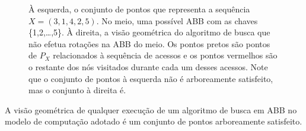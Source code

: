 \begin{figure}[h!]
\begin{minipage}[b]{0.33\textwidth}
    \end{minipage}\hfill
    \begin{minipage}[b]{0.33\textwidth}
        \centering
    \end{minipage}
    \caption{À esquerda, o conjunto de pontos que representa a sequência $X = (3,1,4,2,5)$. No meio, uma possível ABB com as chaves \{1,2,\ldots,5\}. À direita, a visão geométrica do algoritmo de busca que não efetua rotações na ABB do meio. Os pontos pretos são pontos de $P_X$ relacionados à sequência de acessos e os pontos vermelhos são o restante dos nós visitados durante cada um desses acessos. Note que o conjunto de pontos à esquerda não é arboreamente satisfeito, mas o conjunto à direita é.}
\label{fig:traducao-busca-em-ASS}
\end{figure}

\begin{lemma} A visão geométrica de qualquer execução de um algoritmo de busca em ABB no modelo de computação adotado é um conjunto de pontos arboreamente satisfeito.
\label{lema:visao_geometrica_vira_ASS}
\end{lemma}


